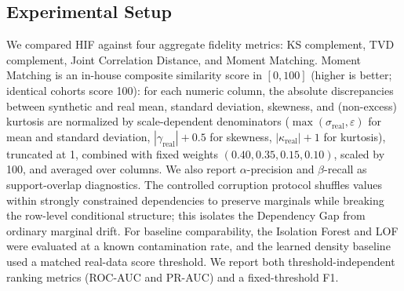 \documentclass[pdflatex,sn-mathphys-num]{sn-jnl}
\theoremstyle{thmstyleone}%
\theoremstyle{thmstyletwo}%
\theoremstyle{thmstylethree}%
\begin{document}
\subsection{Experimental Setup}\label{sec:experimental_setup}

We compared HIF against four aggregate fidelity metrics: KS complement, TVD complement, Joint Correlation Distance, and Moment Matching. Moment Matching is an in-house composite similarity score in $[0,100]$ (higher is better; identical cohorts score 100): for each numeric column, the absolute discrepancies between synthetic and real mean, standard deviation, skewness, and (non-excess) kurtosis are normalized by scale-dependent denominators ($\max(\sigma_{\mathrm{real}}, \varepsilon)$ for mean and standard deviation, $|\gamma_{\mathrm{real}}| + 0.5$ for skewness, $|\kappa_{\mathrm{real}}| + 1$ for kurtosis), truncated at 1, combined with fixed weights $(0.40, 0.35, 0.15, 0.10)$, scaled by 100, and averaged over columns. We also report $\alpha$-precision and $\beta$-recall as support-overlap diagnostics. The controlled corruption protocol shuffles values within strongly constrained dependencies to preserve marginals while breaking the row-level conditional structure; this isolates the Dependency Gap from ordinary marginal drift. For baseline comparability, the Isolation Forest and LOF were evaluated at a known contamination rate, and the learned density baseline used a matched real-data score threshold. We report both threshold-independent ranking metrics (ROC-AUC and PR-AUC) and a fixed-threshold F1.
\end{document}
